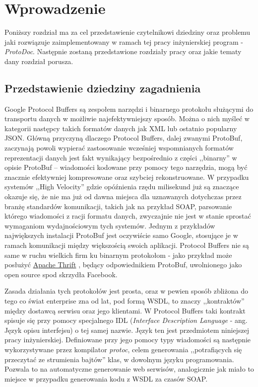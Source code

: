 \documentclass[pdflatex,11pt]{aghdpl}
\author{Konrad Malawski}
\date{2011}
\begin{document}
\titlepages

\tableofcontents
\clearpage

\chapter{Wprowadzenie}
\label{cha:wprowadzenie}

Poniższy rozdział ma za cel przedstawienie czytelnikowi dziedziny oraz problemu jaki rozwiązuje zaimplementowany 
w ramach tej pracy inżynierskiej program - \textit{ProtoDoc}. Następnie zostaną przedstawione rozdziały pracy oraz jakie 
tematy dany rozdział porusza.

\section{Przedstawienie dziedziny zagadnienia}

Google Protocol Buffers są zespołem narzędzi i binarnego protokołu służącymi do transportu danych w możliwie najefektywniejszy sposób.
Można o nich myśleć w kategorii następcy takich formatów danych jak XML lub ostatnio popularny JSON. Główną przyczyną dlaczego Protocol Buffers, 
dalej zwanymi ProtoBuf, zaczynają powoli wypierać zastosowanie wcześniej wspomnianych formatów reprezentacji danych jest fakt wynikający bezpośrednio
z części ,,binarny'' w opisie ProtoBuf -- wiadomości kodowane przy pomocy tego narzędzia, mogą być znacznie efektywniej kompresowane oraz szybciej 
rekonstruowane. W przypadku systemów ,,High Velocity'' gdzie opóźnienia rzędu milisekund już są znaczące okazuje się, że nie ma już od dawna miejsca
dla uznawanych dotychczas przez branżę standardów komunikacji, takich jak na przykład SOAP, parsowanie którego wiadomości z racji formatu danych, zwyczajnie
nie jest w stanie sprostać wymaganiom wydajnościowym tych systemów. Jednym z przykładów największych instalacji ProtoBuf jest oczywiście samo Google, 
stosujące je w ramach komunikacji między większością swoich aplikacji. Protocol Buffers nie są same w ruchu wielkich firm ku binarnym protokołom - 
jako przykład może posłużyć \href{http://thrift.apache.org/}{Apache Thrift} \cite{Thrift}, będący odpowiednikiem ProtoBuf,
uwolnionego jako open source spod skrzydła Facebook. 

Zasada działania tych protokołów jest prosta, oraz w pewien sposób zbliżona do tego co świat enterprise zna od lat, pod formą WSDL, to znaczy ,,kontraktów''
między dostawcą serwisu oraz jego klientami. W Protocol Buffers taki kontrakt spisuje się przy pomocy specjalnego IDL (\textit{Interface Description Language} 
- ang. Język opisu interfejsu) o tej samej nazwie. Język ten jest przedmiotem niniejszej pracy inżynierskiej. Definiowane przy jego pomocy typy wiadomości
są następnie wykorzystywane przez kompilator \textit{protoc}, celem generowania ,,potrafiących się przeczytać ze strumienia bajtów'' klas, w dowolnym języku
programowania. Pozwala to na automatyczne generowanie web serwisów, analogicznie jak miało to miejsce w przypadku generowania kodu z WSDL za czasów SOAP.
\end{document}
